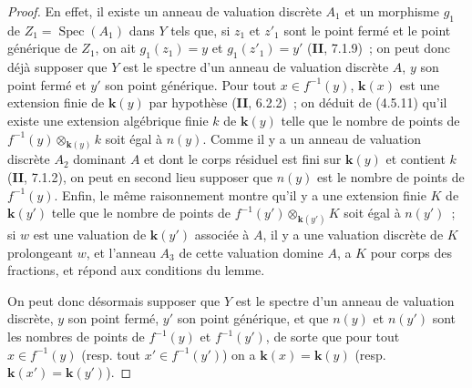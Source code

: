\begin{proof}
En effet, il existe un anneau de valuation discrète $A_1$ et un morphisme $g_1$ de $Z_1=\operatorname{Spec}(A_1)$ dans $Y$ tels que, si $z_1$ et $z'_1$ sont le point fermé et le point générique de $Z_1$,
on ait $g_1(z_1)=y$ et $g_1(z'_1)=y'$ (\textbf{II}, 7.1.9)~; on peut donc déjà supposer que $Y$ est le spectre d'un anneau de valuation discrète $A$, $y$ son point fermé et $y'$ son point générique. Pour tout $x\in f^{-1}(y)$, $\mathbf{k}(x)$ est une extension finie de $\mathbf{k}(y)$ par hypothèse (\textbf{II}, 6.2.2)~; on déduit de (4.5.11) qu'il existe une extension algébrique finie $k$ de $\mathbf{k}(y)$ telle que le nombre de points de $f^{-1}(y)\otimes_{\mathbf{k}(y)}k$ soit égal à $n(y)$. Comme il y a un anneau de valuation discrète $A_2$ dominant $A$ et dont le corps résiduel est fini sur $\mathbf{k}(y)$ et contient $k$ (\textbf{II}, 7.1.2), on peut en second lieu supposer que $n(y)$ est le nombre de points de $f^{-1}(y)$. Enfin, le même raisonnement montre qu'il y a une extension finie $K$ de $\mathbf{k}(y')$ telle que le nombre de points de $f^{-1}(y')\otimes_{\mathbf{k}(y')}K$ soit égal à $n(y')$~; si $w$ est une valuation de $\mathbf{k}(y')$ associée à $A$, il y a une valuation discrète de $K$ prolongeant $w$, et l'anneau $A_3$ de cette valuation domine $A$, a $K$ pour corps des fractions, et répond aux conditions du lemme.

On peut donc désormais supposer que $Y$ est le spectre d'un anneau de valuation discrète, $y$ son point fermé, $y'$ son point générique, et que $n(y)$ et $n(y')$ sont les nombres de points de $f^{-1}(y)$ et $f^{-1}(y')$, de sorte que pour tout $x\in f^{-1}(y)$ (resp. tout $x'\in f^{-1}(y')$) on a $\mathbf{k}(x)=\mathbf{k}(y)$ (resp. $\mathbf{k}(x')=\mathbf{k}(y')$).


\end{proof}
